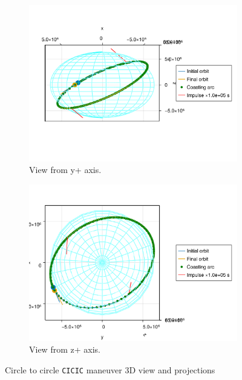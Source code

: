 \begin{figure}[htbp]
\begin{subfigure}{0.49\linewidth}
        \includegraphics[width=\linewidth]{../results/j2/ipv_noncop/CICIC_y+.png}
        \caption{View from y+ axis.}
    \end{subfigure}
    \begin{subfigure}{0.49\linewidth}
        \includegraphics[width=\linewidth]{../results/j2/ipv_noncop/CICIC_z+.png}
        \caption{View from z+ axis.}
    \end{subfigure}
    \caption{Circle to circle \texttt{CICIC} maneuver 3D view and projections}
    \label{fig:j2_ncop_CICIC_figs}
\end{figure}

